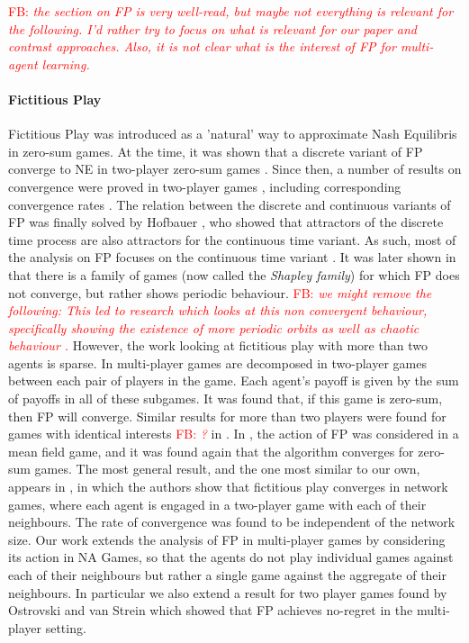 \documentclass{article}
\theoremstyle{definition}
\newcommand{\fb}[1]{\textcolor{red}{FB: \textit{#1}}}
\begin{document}
\fb{the section on FP is very well-read, but maybe not everything is
  relevant for the following. I'd rather try to focus on what is
  relevant for our paper and contrast approaches.  Also, it is not
  clear what is the interest of FP for multi-agent learning.  }

\paragraph{Fictitious Play}
%
Fictitious Play \cite{BrownPublished,
  BrownUnpublished}
was introduced
as a 'natural' way
to approximate Nash Equilibris in zero-sum games. At the time, it was
shown that a discrete variant of FP
converge to 
NE in two-player zero-sum games \cite{Robinson}. Since then, a number
of results on convergence were proved in two-player games
\cite{Miyasawa, Polak, Berger, Monderer and Sela, Monderer and
  Shapley}, including
corresponding convergence rates \cite{Harris,
  Shapiro}.
The relation between the discrete and continuous variants of FP was
finally solved by Hofbauer \cite{Hofbauer}, who showed that attractors
of the discrete time process are also attractors for the continuous
time variant. As such, most of the analysis on FP focuses on the
continuous time variant \cite{Ostrovski}. It was later shown in
\cite{Shapley} that there is a family of games (now called the
\emph{Shapley family}) for which FP does not converge, but
rather shows periodic behaviour. \fb{we might remove the following: This led to research which looks at
this non convergent behaviour, specifically showing the existence of
more periodic orbits as well as chaotic behaviour
\cite{Sparrow}.} However, the work looking at fictitious play
with more than two agents is sparse. In \cite{Sela}
multi-player games are decomposed
in two-player games between each pair of players in the game.
Each agent's payoff is given by the sum of payoffs in all of these
subgames. It was found that, if this game is zero-sum, then FP will
converge. Similar results for more than two players were found for
games with identical interests \fb{?} in \cite{MondererShapley1994}. In
\cite{FPMFG}, the action of FP was considered in a mean field game,
and it was found again that the algorithm converges for zero-sum
games. The most general result, and the one most similar to our own,
appears in
\cite{Ewerhart}, in which
the authors show that fictitious play converges in network games, where
each agent is engaged in a two-player game with each of their
neighbours. The rate of convergence was found to be independent of the
network size.  Our work extends the analysis of FP in multi-player
games by considering its action in NA Games, so that the agents do not
play individual games against each of their neighbours but rather a
single game against the aggregate of their neighbours. In particular
we also extend a result for two player games found by Ostrovski and
van Strein \cite{Payoff Performance} which showed that FP achieves
no-regret in the multi-player setting.
\end{document}
